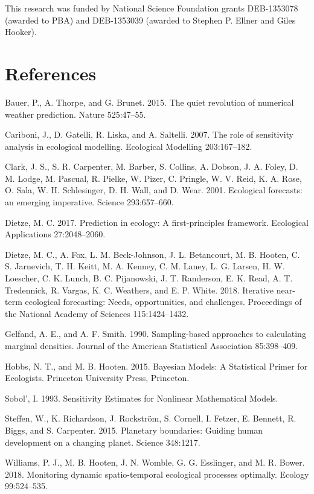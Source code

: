\documentclass[12pt,]{article}
\begin{document}
This research was funded by National Science Foundation grants
DEB-1353078 (awarded to PBA) and DEB-1353039 (awarded to Stephen P.
Ellner and Giles Hooker).

\setlength{\parindent}{0pt}

\hypertarget{references}{%
\section{References}\label{references}}

\hypertarget{refs}{}
\leavevmode\hypertarget{ref-Bauer2015}{}%
Bauer, P., A. Thorpe, and G. Brunet. 2015. The quiet revolution of
numerical weather prediction. Nature 525:47--55.

\leavevmode\hypertarget{ref-Cariboni2007}{}%
Cariboni, J., D. Gatelli, R. Liska, and A. Saltelli. 2007. The role of
sensitivity analysis in ecological modelling. Ecological Modelling
203:167--182.

\leavevmode\hypertarget{ref-Clark2001}{}%
Clark, J. S., S. R. Carpenter, M. Barber, S. Collins, A. Dobson, J. A.
Foley, D. M. Lodge, M. Pascual, R. Pielke, W. Pizer, C. Pringle, W. V.
Reid, K. A. Rose, O. Sala, W. H. Schlesinger, D. H. Wall, and D. Wear.
2001. Ecological forecasts: an emerging imperative. Science
293:657--660.

\leavevmode\hypertarget{ref-Dietze2017a}{}%
Dietze, M. C. 2017. Prediction in ecology: A first-principles framework.
Ecological Applications 27:2048--2060.

\leavevmode\hypertarget{ref-Dietze2018}{}%
Dietze, M. C., A. Fox, L. M. Beck-Johnson, J. L. Betancourt, M. B.
Hooten, C. S. Jarnevich, T. H. Keitt, M. A. Kenney, C. M. Laney, L. G.
Larsen, H. W. Loescher, C. K. Lunch, B. C. Pijanowski, J. T. Randerson,
E. K. Read, A. T. Tredennick, R. Vargas, K. C. Weathers, and E. P.
White. 2018. Iterative near-term ecological forecasting: Needs,
opportunities, and challenges. Proceedings of the National Academy of
Sciences 115:1424--1432.

\leavevmode\hypertarget{ref-Gelfand1990}{}%
Gelfand, A. E., and A. F. Smith. 1990. Sampling-based approaches to
calculating marginal densities. Journal of the American Statistical
Association 85:398--409.

\leavevmode\hypertarget{ref-Hobbs2015}{}%
Hobbs, N. T., and M. B. Hooten. 2015. Bayesian Models: A Statistical
Primer for Ecologists. Princeton University Press, Princeton.

\leavevmode\hypertarget{ref-Sobol1993}{}%
Sobol', I. 1993. Sensitivity Estimates for Nonlinear Mathematical
Models.

\leavevmode\hypertarget{ref-Steffen2015}{}%
Steffen, W., K. Richardson, J. Rockström, S. Cornell, I. Fetzer, E.
Bennett, R. Biggs, and S. Carpenter. 2015. Planetary boundaries: Guiding
human development on a changing planet. Science 348:1217.

\leavevmode\hypertarget{ref-Williams2018}{}%
Williams, P. J., M. B. Hooten, J. N. Womble, G. G. Esslinger, and M. R.
Bower. 2018. Monitoring dynamic spatio-temporal ecological processes
optimally. Ecology 99:524--535.
\end{document}
